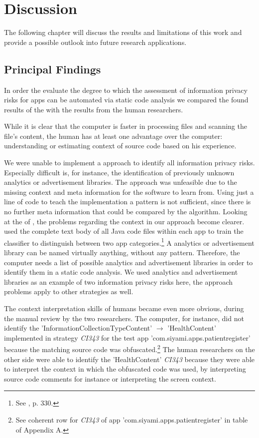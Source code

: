 \section{Discussion}

The following chapter will discuss the results and limitations of this work and provide a possible outlook into future research applications.

\subsection{Principal Findings}

In order the evaluate the degree to which the assessment of information privacy risks for \mH apps can be automated via static code analysis we compared the \ipr found results of the \aiprat with the results from the human researchers.

While it is clear that the computer is faster in processing files and scanning the file's content, the human has at least one advantage over the computer: understanding or estimating context of source code based on his experience.

We were unable to implement a \ml approach to identify all information privacy risks.
Especially difficult is, for instance, the identification of previously unknown analytics or advertisement libraries.
The \ml approach was unfeasible due to the missing context and meta information for the software to learn from.
Using just a line of code to teach the \ml implementation a pattern is not sufficient, since there is no further meta information that could be compared by the algorithm.
Looking at the \ml of \textcite{Shabtai2010}, the problems regarding the context in our approach become clearer.
\textcite{Shabtai2010} used the complete text body of all Java code files within each app to train the \ml classifier to distinguish between two app categories.\footnote{See \cite{Shabtai2010}, p. 330.}
A analytics or advertisement library can be named virtually anything, without any pattern.
Therefore, the computer needs a list of possible analytics and advertisement libraries in order to identify them in a static code analysis.
We used analytics and advertisement libraries as an example of two information privacy risks here, the \ml approach problems apply to other \ipr strategies as well.

The context interpretation skills of humans became even more obvious, during the manual review by the two researchers.
The computer, for instance, did not identify the \ipr 'InformationCollectionTypeContent' $\rightarrow$ 'HealthContent' implemented in strategy \textit{CI343} for the test app 'com.siyami.apps.patientregister' because the matching source code was obfuscated.\footnote{See coherent row for \textit{CI343} of app 'com.siyami.apps.patientregister'  in table of Appendix A.}
The human researchers on the other side were able to identify the 'HealthContent' \textit{CI343} \ipr because they were able to interpret the context in which the obfuscated code was used, by interpreting source code comments for instance or interpreting the screen context.

